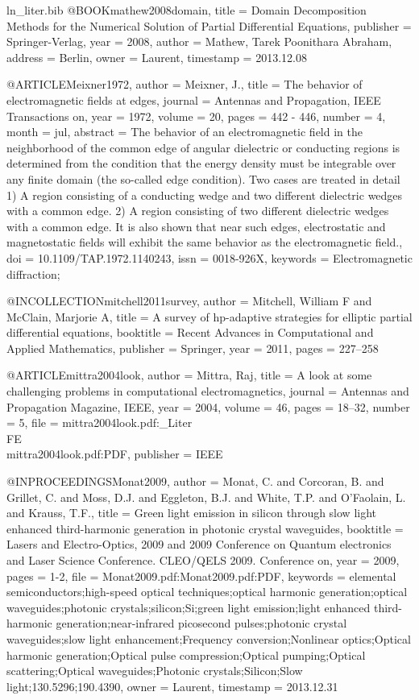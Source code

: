 \begin{filecontents*}{ln_liter.bib}
@BOOK{mathew2008domain,
  title = {Domain Decomposition Methods for the Numerical Solution of Partial
	Differential Equations},
  publisher = {Springer-Verlag},
  year = {2008},
  author = {Mathew, Tarek Poonithara Abraham},
  address = {Berlin},
  owner = {Laurent},
  timestamp = {2013.12.08}
}

@ARTICLE{Meixner1972,
  author = { Meixner, J.},
  title = {The behavior of electromagnetic fields at edges},
  journal = {Antennas and Propagation, IEEE Transactions on},
  year = {1972},
  volume = {20},
  pages = { 442 - 446},
  number = {4},
  month = {jul},
  abstract = { The behavior of an electromagnetic field in the neighborhood of the
	common edge of angular dielectric or conducting regions is determined
	from the condition that the energy density must be integrable over
	any finite domain (the so-called edge condition). Two cases are treated
	in detail 1) A region consisting of a conducting wedge and two different
	dielectric wedges with a common edge. 2) A region consisting of two
	different dielectric wedges with a common edge. It is also shown
	that near such edges, electrostatic and magnetostatic fields will
	exhibit the same behavior as the electromagnetic field.},
  doi = {10.1109/TAP.1972.1140243},
  issn = {0018-926X},
  keywords = { Electromagnetic diffraction;}
}

@INCOLLECTION{mitchell2011survey,
  author = {Mitchell, William F and McClain, Marjorie A},
  title = {A survey of hp-adaptive strategies for elliptic partial differential
	equations},
  booktitle = {Recent Advances in Computational and Applied Mathematics},
  publisher = {Springer},
  year = {2011},
  pages = {227--258}
}

@ARTICLE{mittra2004look,
  author = {Mittra, Raj},
  title = {A look at some challenging problems in computational electromagnetics},
  journal = {Antennas and Propagation Magazine, IEEE},
  year = {2004},
  volume = {46},
  pages = {18--32},
  number = {5},
  file = {mittra2004look.pdf:_Liter\\FE\\mittra2004look.pdf:PDF},
  publisher = {IEEE}
}

@INPROCEEDINGS{Monat2009,
  author = {Monat, C. and Corcoran, B. and Grillet, C. and Moss, D.J. and Eggleton,
	B.J. and White, T.P. and O'Faolain, L. and Krauss, T.F.},
  title = {Green light emission in silicon through slow light enhanced third-harmonic
	generation in photonic crystal waveguides},
  booktitle = {Lasers and Electro-Optics, 2009 and 2009 Conference on Quantum electronics
	and Laser Science Conference. CLEO/QELS 2009. Conference on},
  year = {2009},
  pages = {1-2},
  file = {Monat2009.pdf:Monat2009.pdf:PDF},
  keywords = {elemental semiconductors;high-speed optical techniques;optical harmonic
	generation;optical waveguides;photonic crystals;silicon;Si;green
	light emission;light enhanced third-harmonic generation;near-infrared
	picosecond pulses;photonic crystal waveguides;slow light enhancement;Frequency
	conversion;Nonlinear optics;Optical harmonic generation;Optical pulse
	compression;Optical pumping;Optical scattering;Optical waveguides;Photonic
	crystals;Silicon;Slow light;130.5296;190.4390},
  owner = {Laurent},
  timestamp = {2013.12.31}
}


\end{filecontents*}
